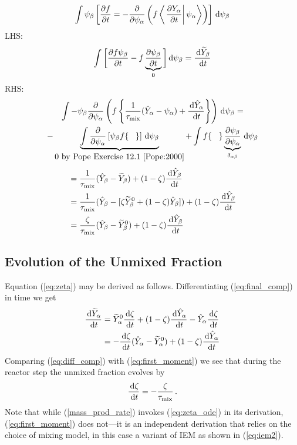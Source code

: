 \begin{align}
\int \psi_\beta \left[ \frac{\partial f}{\partial t} = - \frac{\partial}{\partial \psi_\alpha} \left( f \left\langle \left. \frac{\partial Y_\alpha}{\partial t} \right| \psi_\alpha \right\rangle \right) \right] \d \psi_\beta
\end{align}
LHS:
\begin{align}
\int \bigg[ \frac{\partial f \psi_\beta}{\partial t} - f \underbrace{\frac{\partial \psi_\beta}{\partial t}}_{0} \bigg] \d \psi_\beta = \frac{\d \widetilde{Y}_\beta}{\d t}
\end{align}
RHS:
\begin{multline}
\int - \psi_\beta \frac{\partial}{\partial \psi_\alpha} \left( f \left\{ \frac{1}{\tau_{\si{mix}}}(\hat{Y}_\alpha - \psi_\alpha) + \frac{\d \hat{Y}_\alpha}{\d t} \right\} \right) \d \psi_\beta =\\ - \underbrace{\int \frac{\partial}{\partial \psi_\alpha}\left[ \psi_\beta f \{ \;\;\; \} \right] \d \psi_\beta}_{\mbox{0 by Pope Exercise 12.1 \cite{Pope:2000}}} + \int f \{\;\;\;\} \underbrace{\frac{\partial \psi_\beta}{\partial \psi_\alpha}}_{\delta_{\alpha \beta}} \d \psi_\beta
\end{multline}
\begin{align}
&= \frac{1}{\tau_{\si{mix}}}(\hat{Y}_\beta - \widetilde{Y}_\beta) + (1-\zeta) \frac{\d \hat{Y}_\beta}{\d t} \notag\\
&= \frac{1}{\tau_{\si{mix}}}(\hat{Y}_\beta - [\zeta \widetilde{Y}_\beta^0 + (1-\zeta)\hat{Y}_\beta]) + (1-\zeta) \frac{\d \hat{Y}_\beta}{\d t} \notag\\
&= \frac{\zeta}{\tau_{\si{mix}}}(\hat{Y}_\beta - \widetilde{Y}_\beta^0) + (1-\zeta) \frac{\d \hat{Y}_\beta}{\d t} \label{eq:first_moment}
\end{align}

\subsection*{Evolution of the Unmixed Fraction}
\label{app:evo_unmixed}

Equation (\ref{eq:zeta}) may be derived as follows.  Differentiating (\ref{eq:final_comp}) in time we get
\begin{align}
\label{eq:diff_comp}
\frac{\d \widetilde{Y}_\alpha}{\d t}
&= \widetilde{Y}_\alpha^0 \frac{\d \zeta}{\d t} + (1-\zeta) \frac{\d \hat{Y}_\alpha}{\d t} - \hat{Y}_\alpha \frac{\d \zeta}{\d t} \notag\\
&= - \frac{\d \zeta}{\d t} (\hat{Y}_\alpha-\widetilde{Y}_\alpha^0) + (1-\zeta) \frac{\d \hat{Y}_\alpha}{\d t}
\end{align}
Comparing (\ref{eq:diff_comp}) with (\ref{eq:first_moment}) we see that during the reactor step the unmixed fraction evolves by
\begin{equation}
\label{eq:zeta_ode}
\frac{\d \zeta}{\d t} = - \frac{\zeta}{\tau_{\si{mix}}} \,\mbox{.}
\end{equation}
Note that while (\ref{mass_prod_rate}) invokes (\ref{eq:zeta_ode}) in its derivation, (\ref{eq:first_moment}) does not---it is an independent derivation that relies on the choice of mixing model, in this case a variant of IEM as shown in (\ref{eq:iem2}).



